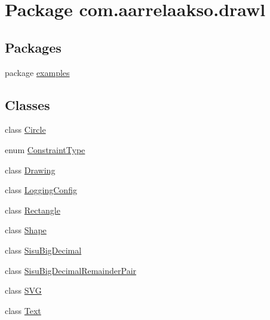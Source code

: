 \hypertarget{namespacecom_1_1aarrelaakso_1_1drawl}{}\section{Package com.\+aarrelaakso.\+drawl}
\label{namespacecom_1_1aarrelaakso_1_1drawl}
\subsection*{Packages}
\begin{DoxyCompactItemize}
\item 
package \hyperlink{namespacecom_1_1aarrelaakso_1_1drawl_1_1examples}{examples}
\end{DoxyCompactItemize}
\subsection*{Classes}
\begin{DoxyCompactItemize}
\item 
class \hyperlink{classcom_1_1aarrelaakso_1_1drawl_1_1_circle}{Circle}
\item 
enum \hyperlink{enumcom_1_1aarrelaakso_1_1drawl_1_1_constraint_type}{Constraint\+Type}
\item 
class \hyperlink{classcom_1_1aarrelaakso_1_1drawl_1_1_drawing}{Drawing}
\item 
class \hyperlink{classcom_1_1aarrelaakso_1_1drawl_1_1_logging_config}{Logging\+Config}
\item 
class \hyperlink{classcom_1_1aarrelaakso_1_1drawl_1_1_rectangle}{Rectangle}
\item 
class \hyperlink{classcom_1_1aarrelaakso_1_1drawl_1_1_shape}{Shape}
\item 
class \hyperlink{classcom_1_1aarrelaakso_1_1drawl_1_1_sisu_big_decimal}{Sisu\+Big\+Decimal}
\item 
class \hyperlink{classcom_1_1aarrelaakso_1_1drawl_1_1_sisu_big_decimal_remainder_pair}{Sisu\+Big\+Decimal\+Remainder\+Pair}
\item 
class \hyperlink{classcom_1_1aarrelaakso_1_1drawl_1_1_s_v_g}{S\+VG}
\item 
class \hyperlink{classcom_1_1aarrelaakso_1_1drawl_1_1_text}{Text}
\end{DoxyCompactItemize}
